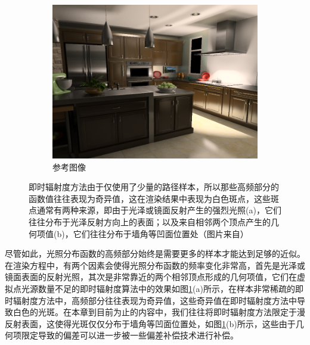 \begin{figure}
\begin{fullwidth}
\begin{subfigure}[b]{0.33\thewidth}
		\includegraphics[width=1.0\textwidth]{figures/ir/vsl-reference}
		\caption{参考图像}
	\end{subfigure}
	\caption{即时辐射度方法由于仅使用了少量的路径样本，所以那些高频部分的函数值往往表现为奇异值，这在渲染结果中表现为白色斑点，这些斑点通常有两种来源，即由于光泽或镜面反射产生的强烈光照(a)，它们往往分布于光泽反射方向上的表面；以及来自相邻两个顶点产生的几何项值(b)，它们往往分布于墙角等凹面位置处（图片来自\cite{a:VirtualSphericalGaussianLightsforRealtimeGlossyIndirectIllumination}）}
	\label{f:ir-avoid-singularities}
\end{fullwidth}
\end{figure}

尽管如此，光照分布函数的高频部分始终是需要更多的样本才能达到足够的近似。在渲染方程中，有两个因素会使得光照分布函数的频率变化非常高，首先是光泽或镜面表面的反射光照，其次是非常靠近的两个相邻顶点形成的几何项值，它们在虚拟点光源数量不足的即时辐射度算法中的效果如图\ref{f:ir-avoid-singularities}(a)所示，在样本非常稀疏的即时辐射度方法中，高频部分往往表现为奇异值，这些奇异值在即时辐射度方法中导致白色的光斑。在本章到目前为止的内容中，我们往往将即时辐射度方法限定于漫反射表面，这使得光斑仅仅分布于墙角等凹面位置处，如图\ref{f:ir-avoid-singularities}(b)所示，这些由于几何项限定导致的偏差可以进一步被一些偏差补偿技术进行补偿。

